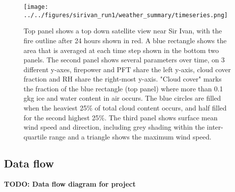     \begin{figure}
      \texttt{[image: ../../figures/sirivan\_run1/weather\_summary/timeseries.png]}
      \caption{%
        Top panel shows a top down satellite view near Sir Ivan, with the fire outline after 24 hours shown in red. A blue rectangle shows the area that is averaged at each time step shown in the bottom two panels.
        The second panel shows several parameters over time, on 3 different y-axes, firepower and PFT share the left y-axis, cloud cover fraction and RH share the right-most y-axis.
        "Cloud cover" marks the fraction of the blue rectangle (top panel) where more than 0.1 g\/kg ice and water content in air occurs. 
        The blue circles are filled when the heaviest 25\% of total cloud content occurs, and half filled for the second highest 25\%.
        The third panel shows surface mean wind speed and direction, including grey shading within the inter-quartile range and a triangle shows the maximum wind speed.}
      \label{fig:model:sirivan_summary_timeseries}
    \end{figure}
  
  \subsection{Data flow}
    \textbf{TODO: Data flow diagram for project}
